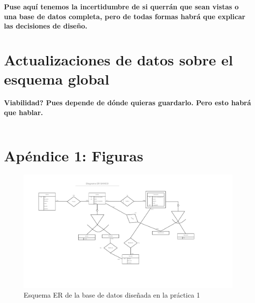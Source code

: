 \documentclass{article}
\begin{document}
\textbf{Puse aquí tenemos la incertidumbre de si querrán que sean vistas o una base de datos completa, pero de todas formas habrá que explicar las decisiones de diseño.}

\section{Actualizaciones de datos sobre el esquema global}

\textbf{Viabilidad? Pues depende de dónde quieras guardarlo. Pero esto habrá que hablar.}\\
\\
\newpage




\section{Apéndice 1: Figuras}

\begin{landscape}
\begin{figure}
\centering
\includegraphics[scale=0.75]{images/er_practica1.png}
\caption{Esquema ER de la base de datos diseñada en la práctica 1}
\label{fig:er1}
\end{figure}
\end{landscape}
\end{document}
